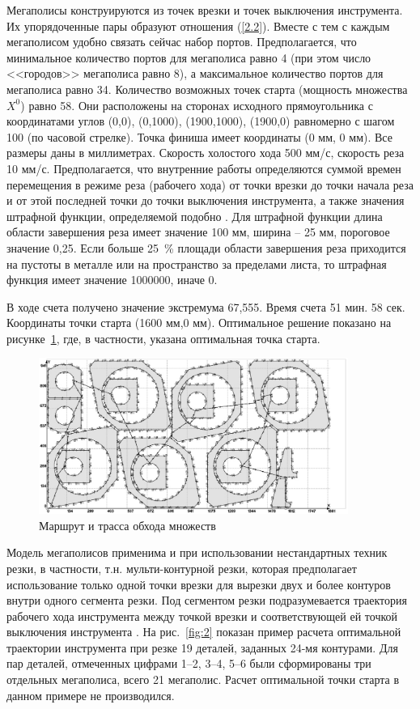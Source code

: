 \documentclass[10pt]{SPIIRAS_Proceedings}
\begin{document}
Мегаполисы конструируются из точек врезки и точек выключения инструмента.
Их упорядоченные пары образуют отношения (\ref{2.2}).
Вместе с тем с каждым мегаполисом удобно связать сейчас набор портов.
Предполагается, что минимальное количество портов для мегаполиса равно 4
(при этом число <<городов>> мегаполиса равно 8),
а максимальное количество портов для мегаполиса равно 34.
Количество возможных точек старта
(мощность множества $X^0$)
равно 58.
Они расположены на сторонах исходного прямоугольника с координатами углов
(0,0), (0,1000), (1900,1000), (1900,0)
равномерно с шагом 100
(по часовой стрелке).
Точка финиша имеет координаты (0 мм, 0 мм).
Все размеры даны в миллиметрах.
Скорость холостого хода 500 мм/с,
скорость реза 10 мм/с.
Предполагается, что внутренние работы определяются
суммой времен перемещения в режиме реза
(рабочего хода)
от точки врезки до точки начала реза
и от этой последней точки до
точки выключения инструмента,
а также значения штрафной функции, определяемой подобно
\cite{18}.
Для штрафной функции длина области завершения реза имеет значение 100 мм,
ширина -- 25 мм,
пороговое значение 0,25.
Если больше 25~\% площади области завершения
реза приходится на пустоты в металле или на пространство за пределами листа,
то штрафная функция имеет значение 1000000, иначе 0.

В ходе счета получено значение экстремума 67,555.
Время счета 51 мин. 58 сек.
Координаты точки старта
(1600 мм,0 мм).
Оптимальное решение показано на рисунке~\ref{fig:1},
где, в частности, указана оптимальная точка старта.

\begin{figure}[]
  \centering
  \includegraphics[width=0.9\textwidth]{image.eps}
  \caption{Маршрут и трасса обхода множеств}
  \label{fig:1}
\end{figure}

Модель мегаполисов применима и при использовании нестандартных техник резки,
в частности, т.н. мульти-контурной резки,
которая предполагает использование только одной точки врезки
для вырезки двух и более контуров внутри одного сегмента резки.
Под сегментом резки подразумевается траектория рабочего хода инструмента
между точкой врезки и соответствующей ей точкой выключения инструмента
\cite{100}.
На рис.~\ref{fig:2}
показан пример расчета оптимальной траектории инструмента
при резке 19 деталей, заданных 24-мя контурами.
Для пар деталей, отмеченных цифрами 1--2, 3--4, 5--6
были сформированы три отдельных мегаполиса,
всего 21 мегаполис.
Расчет оптимальной точки старта в данном примере не производился.
\end{document}

